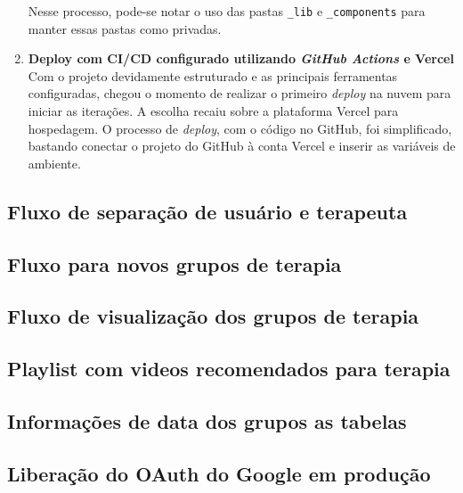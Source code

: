 \begin{enumerate}
    Nesse processo, pode-se notar o uso das pastas \verb|_lib| e \verb|_components| para manter essas pastas como privadas.

    \item\textbf{Deploy com CI/CD configurado utilizando \textit{GitHub Actions} e Vercel}\\
    
    Com o projeto devidamente estruturado e as principais ferramentas configuradas, chegou o momento de realizar o primeiro \textit{deploy} na nuvem para iniciar as iterações. A escolha recaiu sobre a plataforma Vercel para hospedagem. O processo de \textit{deploy}, com o código no GitHub, foi simplificado, bastando conectar o projeto do GitHub à conta Vercel e inserir as variáveis de ambiente.
    
\end{enumerate}


\subsection{Fluxo de separação de usuário e terapeuta}
\subsection{Fluxo para novos grupos de terapia}
\subsection{Fluxo de visualização dos grupos de terapia}
\subsection{Playlist com videos recomendados para terapia}
\subsection{Informações de data dos grupos as tabelas}
\subsection{Liberação do OAuth do Google em produção}